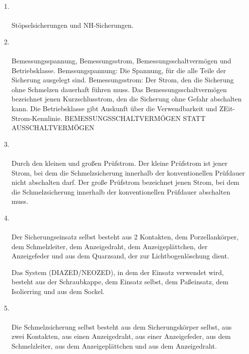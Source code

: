 \begin{enumerate}
    \item   {} \\\\
            Stöpselsicherungen und NH-Sicherungen.
    \item   {} \\\\
            Bemessungsspannung, Bemessungsstrom, Bemessungsschaltvermögen und Betriebsklasse.
            Bemssungspannung: Die Spannung, für die alle Teile der Sicherung ausgelegt sind. Bemessungsstrom: Der Strom, den die Sicherung ohne Schmelzen dauerhaft
            führen muss. Das Bemessungsschaltvermögen bezeichnet jenen Kurzschlusstrom, den die Sicherung ohne Gefahr abschalten kann. Die Betriebsklasse gibt Auskunft über die Verwendbarkeit und 
            ZEit-Strom-Kennlinie.
            \LARGE BEMESSUNGSSCHALTVERMÖGEN STATT AUSSCHALTVERMÖGEN \normalsize
    \item   {} \\\\
            Durch den kleinen und großen Prüfstrom. Der kleine Prüfstrom ist jener Strom, bei dem die Schmelzsicherung innerhalb der konventionellen Prüfdauer nicht abschalten darf.
            Der große Prüfstrom bezeichnet jenen Strom, bei dem die Schmelzsicherung innerhalb der konventionellen Prüfdauer abschalten muss.
    \item   {} \\\\
            Der Sicherungseinsatz selbst besteht aus 2 Kontakten, dem Porzellankörper, dem Schmelzleiter, dem Anzeigedraht, dem Anzeigeplättchen, der Anzeigefeder und aus dem Quarzsand, 
            der zur Lichtbogenlöschung dient.

            Das System (DIAZED/NEOZED), in dem der Einsatz verwendet wird, besteht aus der Schraubkappe, dem Einsatz selbst, dem Paßeinsatz, dem Isolierring und aus dem Sockel.

    \item   {}\\\\
            Die Schmelzsicherung selbst besteht aus dem Sicherungskörper selbst, aus zwei Kontakten, aus einen Anzeigedraht, aus einer Anzeigefeder, aus dem Schmelzleiter, aus dem Anzeigeplättchen und aus dem 
            Anzeigedraht.


\end{enumerate}
